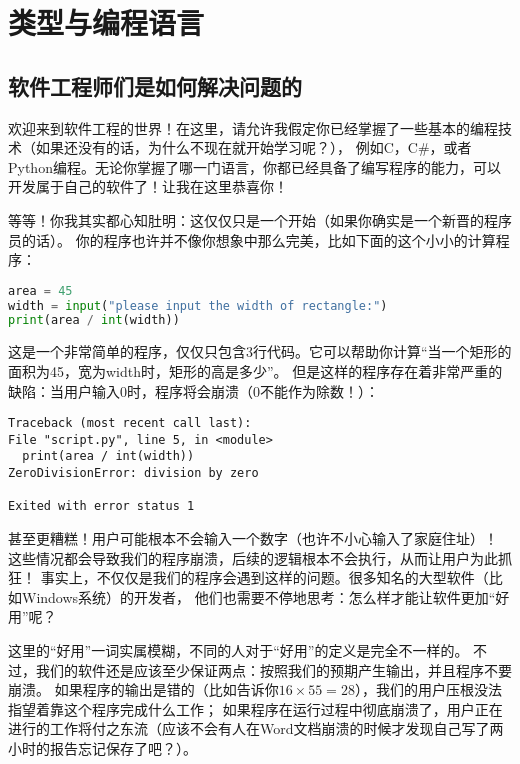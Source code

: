 \documentclass[../main.tex]{subfiles}
\begin{document}
  \section{类型与编程语言}
  \subsection{软件工程师们是如何解决问题的}

  \indent 欢迎来到软件工程的世界！在这里，请允许我假定你已经掌握了一些基本的编程技术（如果还没有的话，为什么不现在就开始学习呢？），
  例如C，C\#，或者Python编程。无论你掌握了哪一门语言，你都已经具备了编写程序的能力，可以开发属于自己的软件了！让我在这里恭喜你！

  \indent 等等！你我其实都心知肚明：这仅仅只是一个开始（如果你确实是一个新晋的程序员的话）。
  你的程序也许并不像你想象中那么完美，比如下面的这个小小的计算程序：

\begin{lstlisting}[language=python]
area = 45
width = input("please input the width of rectangle:")
print(area / int(width))
\end{lstlisting}

  \indent 这是一个非常简单的程序，仅仅只包含3行代码。它可以帮助你计算“当一个矩形的面积为45，宽为width时，矩形的高是多少”。
  但是这样的程序存在着非常严重的缺陷：当用户输入0时，程序将会崩溃（0不能作为除数！）：

\begin{lstlisting}
Traceback (most recent call last):
File "script.py", line 5, in <module>
  print(area / int(width))
ZeroDivisionError: division by zero

Exited with error status 1
\end{lstlisting}

  \indent 甚至更糟糕！用户可能根本不会输入一个数字（也许不小心输入了家庭住址）！
  这些情况都会导致我们的程序崩溃，后续的逻辑根本不会执行，从而让用户为此抓狂！
  事实上，不仅仅是我们的程序会遇到这样的问题。很多知名的大型软件（比如Windows系统）的开发者，
  他们也需要不停地思考：怎么样才能让软件更加“好用”呢？

  \indent 这里的“好用”一词实属模糊，不同的人对于“好用”的定义是完全不一样的。
  不过，我们的软件还是应该至少保证两点：按照我们的预期产生输出，并且程序不要崩溃。
  如果程序的输出是错的（比如告诉你$16 \times 55 = 28$），我们的用户压根没法指望着靠这个程序完成什么工作；
  如果程序在运行过程中彻底崩溃了，用户正在进行的工作将付之东流（应该不会有人在Word文档崩溃的时候才发现自己写了两小时的报告忘记保存了吧？）。
\end{document}

